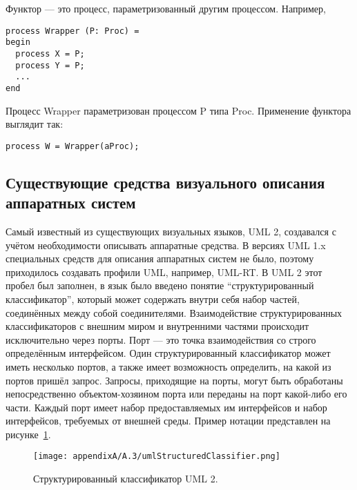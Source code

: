 Функтор --- это процесс, параметризованный другим процессом. Например,

\vspace{5mm}
\begin{minipage}{\linewidth}
\begin{verbatim}
process Wrapper (P: Proc) =
begin
  process X = P;
  process Y = P;
  ...
end
\end{verbatim}
\end{minipage}
\vspace{5mm}

Процесс Wrapper параметризован процессом P типа Proc. Применение функтора выглядит так:
\begin{verbatim}
process W = Wrapper(aProc);
\end{verbatim}

\subsection{Существующие средства визуального описания аппаратных систем}
Самый известный из существующих визуальных языков, UML 2, создавался с учётом необходимости 
описывать аппаратные средства. В версиях UML 1.x специальных средств для описания 
аппаратных систем не было, поэтому приходилось создавать профили UML, например, UML-RT.
В UML 2 этот пробел был заполнен, в язык было введено понятие "`структурированный классификатор"', 
который может содержать внутри себя набор частей, соединённых между собой соединителями. 
Взаимодействие структурированных классификаторов с внешним миром и внутренними частями 
происходит исключительно через порты. Порт --- это точка взаимодействия со строго 
определённым интерфейсом. Один структурированный классификатор может иметь несколько 
портов, а также имеет возможность определить, на какой из портов пришёл запрос. Запросы, 
приходящие на порты, могут быть обработаны непосредственно объектом-хозяином порта 
или переданы на порт какой-либо его части. Каждый порт имеет набор предоставляемых 
им интерфейсов и набор интерфейсов, требуемых от внешней среды. Пример нотации представлен 
на рисунке~\ref{image:umlStructuredClassifier}.

\begin{figure} [ht]
	\begin{center}
		\texttt{[image: appendixA/A.3/umlStructuredClassifier.png]}
		\caption{Структурированный классификатор UML 2.}
		\label{image:umlStructuredClassifier}
	\end{center}
\end{figure}

